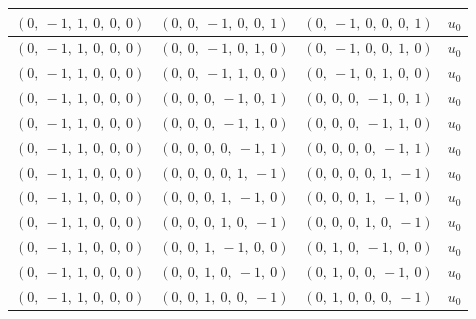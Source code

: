 \documentclass[11pt]{article}
\theoremstyle{definition}
\begin{document}
\begin{longtable}{|l|l|l|c|}
    \hline
    $\left( 0, \  -1, \  1, \  0, \  0, \  0\right)$ & $\left( 0, \  0, \  -1, \  0, \  0, \  1\right)$ & $\left( 0, \  -1, \  0, \  0, \  0, \  1\right)$ & $u_{0}$ \\
    \hline
    $\left( 0, \  -1, \  1, \  0, \  0, \  0\right)$ & $\left( 0, \  0, \  -1, \  0, \  1, \  0\right)$ & $\left( 0, \  -1, \  0, \  0, \  1, \  0\right)$ & $u_{0}$ \\
    \hline
    $\left( 0, \  -1, \  1, \  0, \  0, \  0\right)$ & $\left( 0, \  0, \  -1, \  1, \  0, \  0\right)$ & $\left( 0, \  -1, \  0, \  1, \  0, \  0\right)$ & $u_{0}$ \\
    \hline
    $\left( 0, \  -1, \  1, \  0, \  0, \  0\right)$ & $\left( 0, \  0, \  0, \  -1, \  0, \  1\right)$ & $\left( 0, \  0, \  0, \  -1, \  0, \  1\right)$ & $u_{0}$ \\
    \hline
    $\left( 0, \  -1, \  1, \  0, \  0, \  0\right)$ & $\left( 0, \  0, \  0, \  -1, \  1, \  0\right)$ & $\left( 0, \  0, \  0, \  -1, \  1, \  0\right)$ & $u_{0}$ \\
    \hline
    $\left( 0, \  -1, \  1, \  0, \  0, \  0\right)$ & $\left( 0, \  0, \  0, \  0, \  -1, \  1\right)$ & $\left( 0, \  0, \  0, \  0, \  -1, \  1\right)$ & $u_{0}$ \\
    \hline
    $\left( 0, \  -1, \  1, \  0, \  0, \  0\right)$ & $\left( 0, \  0, \  0, \  0, \  1, \  -1\right)$ & $\left( 0, \  0, \  0, \  0, \  1, \  -1\right)$ & $u_{0}$ \\
    \hline
    $\left( 0, \  -1, \  1, \  0, \  0, \  0\right)$ & $\left( 0, \  0, \  0, \  1, \  -1, \  0\right)$ & $\left( 0, \  0, \  0, \  1, \  -1, \  0\right)$ & $u_{0}$ \\
    \hline
    $\left( 0, \  -1, \  1, \  0, \  0, \  0\right)$ & $\left( 0, \  0, \  0, \  1, \  0, \  -1\right)$ & $\left( 0, \  0, \  0, \  1, \  0, \  -1\right)$ & $u_{0}$ \\
    \hline
    $\left( 0, \  -1, \  1, \  0, \  0, \  0\right)$ & $\left( 0, \  0, \  1, \  -1, \  0, \  0\right)$ & $\left( 0, \  1, \  0, \  -1, \  0, \  0\right)$ & $u_{0}$ \\
    \hline
    $\left( 0, \  -1, \  1, \  0, \  0, \  0\right)$ & $\left( 0, \  0, \  1, \  0, \  -1, \  0\right)$ & $\left( 0, \  1, \  0, \  0, \  -1, \  0\right)$ & $u_{0}$ \\
    \hline
    $\left( 0, \  -1, \  1, \  0, \  0, \  0\right)$ & $\left( 0, \  0, \  1, \  0, \  0, \  -1\right)$ & $\left( 0, \  1, \  0, \  0, \  0, \  -1\right)$ & $u_{0}$ \\

\end{longtable}
\end{document}
